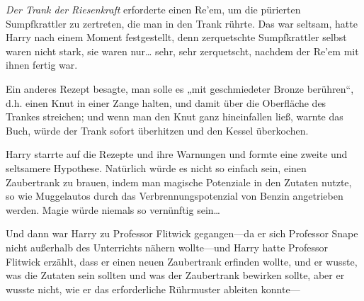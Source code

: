 \emph{Der Trank der Riesenkraft} erforderte einen Re’em, um die pürierten Sumpfkrattler zu zertreten, die man in den Trank rührte. Das war seltsam, hatte Harry nach einem Moment festgestellt, denn zerquetschte Sumpfkrattler selbst waren nicht stark, sie waren nur… sehr, sehr zerquetscht, nachdem der Re’em mit ihnen fertig war.

Ein anderes Rezept besagte, man solle es „mit geschmiedeter Bronze berühren“, d.h. einen Knut in einer Zange halten, und damit über die Oberfläche des Trankes streichen; und wenn man den Knut ganz hineinfallen ließ, warnte das Buch, würde der Trank sofort überhitzen und den Kessel überkochen.

Harry starrte auf die Rezepte und ihre Warnungen und formte eine zweite und seltsamere Hypothese. Natürlich würde es nicht so einfach sein, einen Zaubertrank zu brauen, indem man magische Potenziale in den Zutaten nutzte, so wie Muggelautos durch das Verbrennungspotenzial von Benzin angetrieben werden. Magie würde niemals so vernünftig sein…

Und dann war Harry zu Professor Flitwick gegangen—da er sich Professor Snape nicht außerhalb des Unterrichts nähern wollte—und Harry hatte Professor Flitwick erzählt, dass er einen neuen Zaubertrank erfinden wollte, und er wusste, was die Zutaten sein sollten und was der Zaubertrank bewirken sollte, aber er wusste nicht, wie er das erforderliche Rührmuster ableiten konnte—

